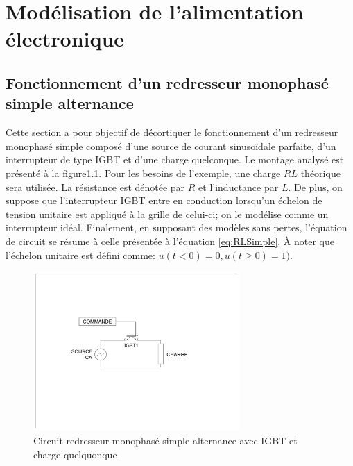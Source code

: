 


\chapter{Modélisation de l'alimentation électronique}
\section{Fonctionnement d'un redresseur monophasé simple alternance}
Cette section a pour objectif de décortiquer le fonctionnement d'un redresseur monophasé simple composé d'une source de courant sinusoïdale parfaite, d'un interrupteur de type IGBT et d'une charge quelconque. Le montage analysé est présenté à la figure\ref{fig:RedresseurMonophaseSimpleAlternanceIGBT}. Pour les besoins de l'exemple, une charge $RL$ théorique sera utilisée. La résistance est dénotée par $R$ et l'inductance par $L$. De plus, on suppose que l'interrupteur IGBT entre en conduction lorsqu'un échelon de tension unitaire est appliqué à la grille de celui-ci; on le modélise comme un interrupteur idéal. Finalement, en supposant des modèles sans pertes, l'équation de circuit se résume à celle présentée à l'équation \ref{eq:RLSimple}. À noter que l'échelon unitaire est défini comme: $u(t<0) = 0, u(t\geq 0) = 1)$.

\begin{figure}[htb!]
	\begin{center}  
		\includegraphics[width=0.7\textwidth]{Circuit/RedresseurMonophaseSimpleAlternanceIGBT}
		\caption{Circuit redresseur monophasé simple alternance avec IGBT et charge quelquonque}
		\label{fig:RedresseurMonophaseSimpleAlternanceIGBT}
	\end{center}   
\end{figure}


